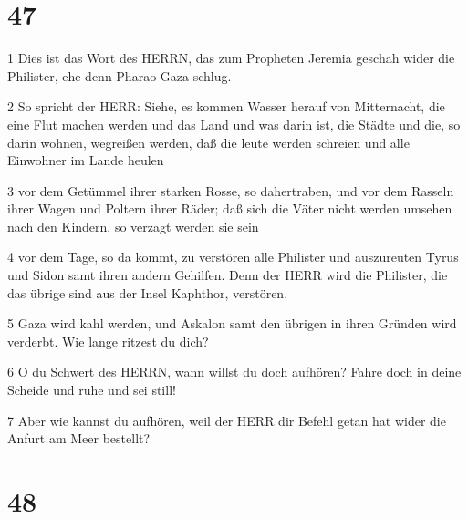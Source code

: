 \chapter{47}

\par 1 Dies ist das Wort des HERRN, das zum Propheten Jeremia geschah wider die Philister, ehe denn Pharao Gaza schlug.
\par 2 So spricht der HERR: Siehe, es kommen Wasser herauf von Mitternacht, die eine Flut machen werden und das Land und was darin ist, die Städte und die, so darin wohnen, wegreißen werden, daß die leute werden schreien und alle Einwohner im Lande heulen
\par 3 vor dem Getümmel ihrer starken Rosse, so dahertraben, und vor dem Rasseln ihrer Wagen und Poltern ihrer Räder; daß sich die Väter nicht werden umsehen nach den Kindern, so verzagt werden sie sein
\par 4 vor dem Tage, so da kommt, zu verstören alle Philister und auszureuten Tyrus und Sidon samt ihren andern Gehilfen. Denn der HERR wird die Philister, die das übrige sind aus der Insel Kaphthor, verstören.
\par 5 Gaza wird kahl werden, und Askalon samt den übrigen in ihren Gründen wird verderbt. Wie lange ritzest du dich?
\par 6 O du Schwert des HERRN, wann willst du doch aufhören? Fahre doch in deine Scheide und ruhe und sei still!
\par 7 Aber wie kannst du aufhören, weil der HERR dir Befehl getan hat wider die Anfurt am Meer bestellt?

\chapter{48}


